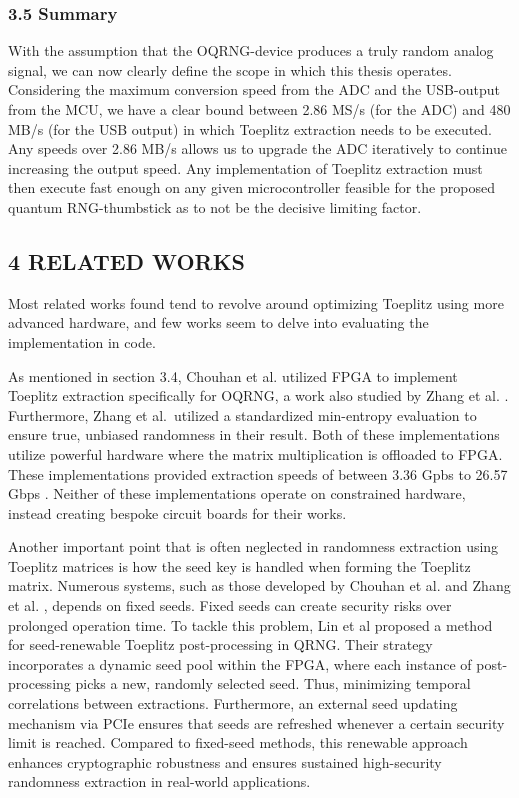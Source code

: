 \hypertarget{summary}{%
\subsubsection{3.5 Summary}\label{summary}}

With the assumption that the OQRNG-device produces a truly random analog signal, we can now clearly define the scope in which this thesis operates. Considering the maximum conversion speed from the ADC and the USB-output from the MCU, we have a clear bound between 2.86 MS/s (for the ADC) and 480 MB/s (for the USB output) in which Toeplitz extraction needs to be executed. Any speeds over 2.86 MB/s allows us to upgrade the ADC iteratively to continue increasing the output speed. Any implementation of Toeplitz extraction must then execute fast enough on any given microcontroller feasible for the proposed quantum RNG-thumbstick as to not be the decisive limiting factor.

\hypertarget{related-works}{%
\subsection{\texorpdfstring{4 RELATED WORKS }{4 RELATED WORKS }}\label{related-works}}

Most related works found tend to revolve around optimizing Toeplitz using more advanced hardware, and few works seem to delve into evaluating the implementation in code.

As mentioned in section 3.4, Chouhan et al. \cite{toeplitz-desc} utilized FPGA to implement Toeplitz extraction specifically for OQRNG, a work also studied by Zhang et al. \cite{toeplitz}. Furthermore, Zhang et al.~utilized a standardized min-entropy evaluation to ensure true, unbiased randomness in their result. Both of these implementations utilize powerful hardware where the matrix multiplication is offloaded to FPGA. These implementations provided extraction speeds of between 3.36 Gpbs \cite{toeplitz} to 26.57 Gbps \cite{toeplitz-desc}. Neither of these implementations operate on constrained hardware, instead creating bespoke circuit boards for their works.

Another important point that is often neglected in randomness extraction using Toeplitz matrices is how the seed key is handled when forming the Toeplitz matrix. Numerous systems, such as those developed by Chouhan et al. \cite{toeplitz-desc} and Zhang et al. \cite{toeplitz}, depends on fixed seeds. Fixed seeds can create security risks over prolonged operation time. To tackle this problem, Lin et al \cite{lin} proposed a method for seed-renewable Toeplitz post-processing in QRNG. Their strategy incorporates a dynamic seed pool within the FPGA, where each instance of post-processing picks a new, randomly selected seed. Thus, minimizing temporal correlations between extractions. Furthermore, an external seed updating mechanism via PCIe ensures that seeds are refreshed whenever a certain security limit is reached. Compared to fixed-seed methods, this renewable approach enhances cryptographic robustness and ensures sustained high-security randomness extraction in real-world applications.

